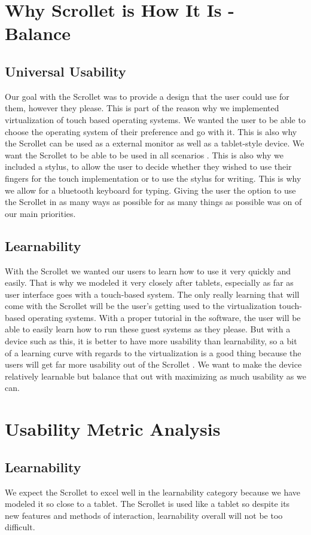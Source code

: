 \documentclass[a4paper]{article}
\begin{document}
\section{Why Scrollet is How It Is - Balance}
\subsection{Universal Usability}
Our goal with the Scrollet was to provide a design that the user could use for them, however they please. This is part of the reason why we implemented virtualization of touch based operating systems. We wanted the user to be able to choose the operating system of their preference and go with it. This is also why the Scrollet can be used as a external monitor as well as a tablet-style device. We want the Scrollet to be able to be used in all scenarios \cite{Nielsen}. This is also why we included a stylus, to allow the user to decide whether they wished to use their fingers for the touch implementation or to use the stylus for writing. This is why we allow for a bluetooth keyboard for typing. Giving the user the option to use the Scrollet in as many ways as possible for as many things as possible was on of our main priorities.

\subsection{Learnability}
With the Scrollet we wanted our users to learn how to use it very quickly and easily. That is why we modeled it very closely after tablets, especially as far as user interface goes with a touch-based system. The only really learning that will come with the Scrollet will be the user's getting used to the virtualization touch-based operating systems. With a proper tutorial in the software, the user will be able to easily learn how to run these guest systems as they please. But with a device such as this, it is better to have more usability than learnability, so a bit of a learning curve with regards to the virtualization is a good thing because the users will get far more usability out of the Scrollet \cite{Tog}. We want to make the device relatively learnable but balance that out with maximizing as much usability as we can.


\section{Usability Metric Analysis}
\subsection{Learnability}
We expect the Scrollet to excel well in the learnability category because we have modeled it so close to a tablet. The Scrollet is used like a tablet so despite its new features and methods of interaction, learnability overall will not be too difficult.
\end{document}
